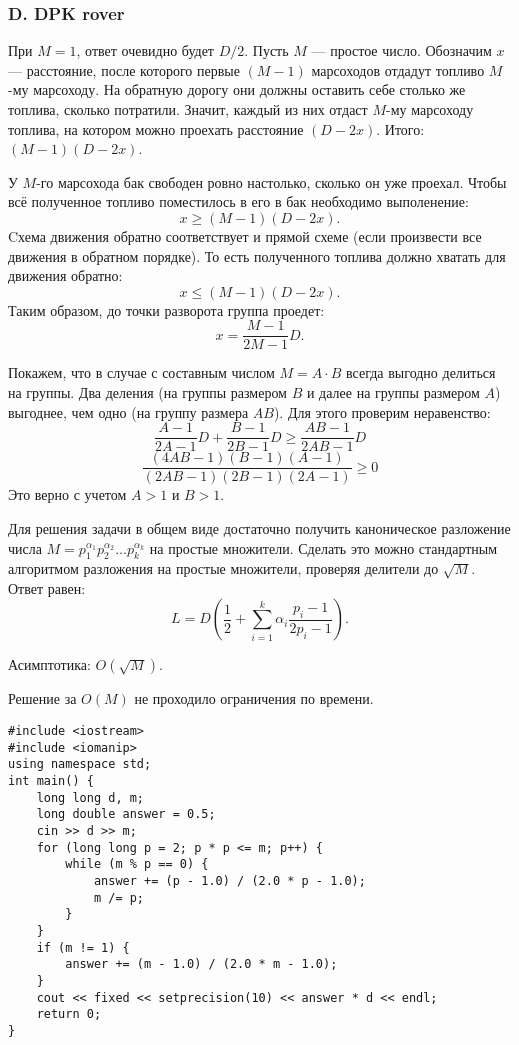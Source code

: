 \subsubsection*{D. DPK rover}

При $M = 1$, ответ очевидно будет $D / 2$. Пусть $M$ --- простое число. Обозначим $x$ --- расстояние, после которого первые $(M-1)$ марсоходов отдадут топливо $M$-му марсоходу. На обратную дорогу они должны оставить себе столько же топлива, сколько потратили. Значит, каждый из них отдаст $M$-му марсоходу топлива, на котором можно проехать расстояние $(D - 2x)$. Итого: $(M - 1) (D - 2x)$.

У $M$-го марсохода бак свободен ровно настолько, сколько он уже проехал. Чтобы всё полученное топливо поместилось в его в бак необходимо выполенение:
$$
x \geqslant (M - 1) (D - 2x).
$$
Cхема движения обратно соответствует и прямой схеме (если произвести все движения в обратном порядке). То есть полученного топлива должно хватать для движения обратно:
$$
x \leqslant (M - 1) (D - 2x).
$$
Таким образом, до точки разворота группа проедет:
$$
x = \frac{M - 1}{2 M - 1} D.
$$

Покажем, что в случае с составным числом $M = A \cdot B$ всегда выгодно делиться на группы. Два деления (на группы размером $B$ и далее на группы размером $A$) выгоднее, чем одно (на группу размера $AB$). Для этого проверим неравенство:
$$ \frac{A - 1}{2 A - 1} D + \frac{B - 1}{2 B - 1} D\geqslant \frac{AB - 1}{2 AB - 1} D$$
$$ \frac{(4 A B - 1)(B - 1)(A - 1)}{(2 AB - 1)(2 B - 1)(2 A - 1)} \geqslant 0$$
Это верно с учетом $A > 1$ и $B > 1$.

Для решения задачи в общем виде достаточно получить каноническое разложение числа $M = p_1^{\alpha_1} p_2^{\alpha_2} \dots p_k^{\alpha_k}$ на простые множители. Сделать это можно стандартным алгоритмом разложения на простые множители, проверяя делители до $\sqrt{M}$. Ответ равен: 
$$L = D \left( \frac{1}{2} + \sum_{i=1}^{k} \alpha_i \frac{p_i - 1}{2 p_i - 1} \right). $$

Асимптотика: $O(\sqrt{M})$. 

Решение за $O(M)$ не проходило ограничения по времени.



\begin{lstlisting}
#include <iostream>
#include <iomanip>
using namespace std;
int main() {
    long long d, m;
    long double answer = 0.5;
    cin >> d >> m; 
    for (long long p = 2; p * p <= m; p++) {
        while (m % p == 0) {
            answer += (p - 1.0) / (2.0 * p - 1.0);
            m /= p;
        }
    }
    if (m != 1) {
        answer += (m - 1.0) / (2.0 * m - 1.0);
    }
    cout << fixed << setprecision(10) << answer * d << endl;
    return 0;
}

\end{lstlisting}




